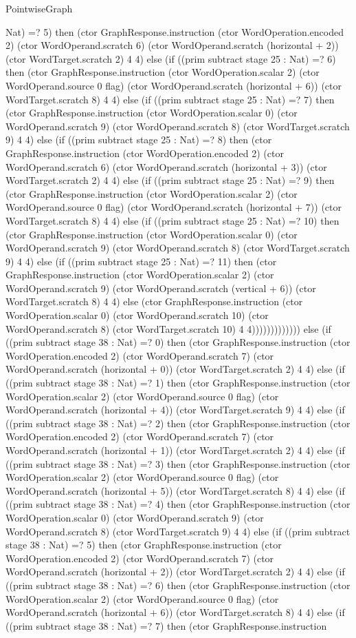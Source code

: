 \begin{lexlean}{PointwiseGraph}
\begin{semanticmodule}
{Nat) =? 5) then (ctor GraphResponse.instruction (ctor WordOperation.encoded 2) (ctor WordOperand.scratch 6) (ctor WordOperand.scratch (horizontal + 2)) (ctor WordTarget.scratch 2) 4 4) else (if ((prim subtract stage 25 : Nat) =? 6) then (ctor GraphResponse.instruction (ctor WordOperation.scalar 2) (ctor WordOperand.source 0 flag) (ctor WordOperand.scratch (horizontal + 6)) (ctor WordTarget.scratch 8) 4 4) else (if ((prim subtract stage 25 : Nat) =? 7) then (ctor GraphResponse.instruction (ctor WordOperation.scalar 0) (ctor WordOperand.scratch 9) (ctor WordOperand.scratch 8) (ctor WordTarget.scratch 9) 4 4) else (if ((prim subtract stage 25 : Nat) =? 8) then (ctor GraphResponse.instruction (ctor WordOperation.encoded 2) (ctor WordOperand.scratch 6) (ctor WordOperand.scratch (horizontal + 3)) (ctor WordTarget.scratch 2) 4 4) else (if ((prim subtract stage 25 : Nat) =? 9) then (ctor GraphResponse.instruction (ctor WordOperation.scalar 2) (ctor WordOperand.source 0 flag) (ctor WordOperand.scratch (horizontal + 7)) (ctor WordTarget.scratch 8) 4 4) else (if ((prim subtract stage 25 : Nat) =? 10) then (ctor GraphResponse.instruction (ctor WordOperation.scalar 0) (ctor WordOperand.scratch 9) (ctor WordOperand.scratch 8) (ctor WordTarget.scratch 9) 4 4) else (if ((prim subtract stage 25 : Nat) =? 11) then (ctor GraphResponse.instruction (ctor WordOperation.scalar 2) (ctor WordOperand.scratch 9) (ctor WordOperand.scratch (vertical + 6)) (ctor WordTarget.scratch 8) 4 4) else (ctor GraphResponse.instruction (ctor WordOperation.scalar 0) (ctor WordOperand.scratch 10) (ctor WordOperand.scratch 8) (ctor WordTarget.scratch 10) 4 4))))))))))))) else (if ((prim subtract stage 38 : Nat) =? 0) then (ctor GraphResponse.instruction (ctor WordOperation.encoded 2) (ctor WordOperand.scratch 7) (ctor WordOperand.scratch (horizontal + 0)) (ctor WordTarget.scratch 2) 4 4) else (if ((prim subtract stage 38 : Nat) =? 1) then (ctor GraphResponse.instruction (ctor WordOperation.scalar 2) (ctor WordOperand.source 0 flag) (ctor WordOperand.scratch (horizontal + 4)) (ctor WordTarget.scratch 9) 4 4) else (if ((prim subtract stage 38 : Nat) =? 2) then (ctor GraphResponse.instruction (ctor WordOperation.encoded 2) (ctor WordOperand.scratch 7) (ctor WordOperand.scratch (horizontal + 1)) (ctor WordTarget.scratch 2) 4 4) else (if ((prim subtract stage 38 : Nat) =? 3) then (ctor GraphResponse.instruction (ctor WordOperation.scalar 2) (ctor WordOperand.source 0 flag) (ctor WordOperand.scratch (horizontal + 5)) (ctor WordTarget.scratch 8) 4 4) else (if ((prim subtract stage 38 : Nat) =? 4) then (ctor GraphResponse.instruction (ctor WordOperation.scalar 0) (ctor WordOperand.scratch 9) (ctor WordOperand.scratch 8) (ctor WordTarget.scratch 9) 4 4) else (if ((prim subtract stage 38 : Nat) =? 5) then (ctor GraphResponse.instruction (ctor WordOperation.encoded 2) (ctor WordOperand.scratch 7) (ctor WordOperand.scratch (horizontal + 2)) (ctor WordTarget.scratch 2) 4 4) else (if ((prim subtract stage 38 : Nat) =? 6) then (ctor GraphResponse.instruction (ctor WordOperation.scalar 2) (ctor WordOperand.source 0 flag) (ctor WordOperand.scratch (horizontal + 6)) (ctor WordTarget.scratch 8) 4 4) else (if ((prim subtract stage 38 : Nat) =? 7) then (ctor GraphResponse.instruction }
\end{semanticmodule}
\end{lexlean}
